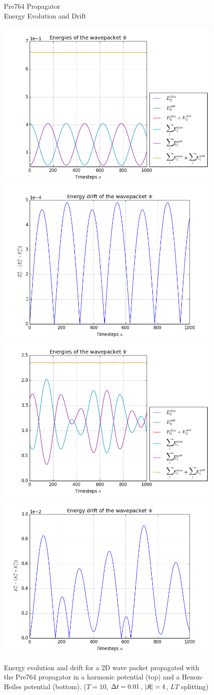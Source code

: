 \begin{figure}[ht]
	\centering
	\begin{minipage}[c]{\textwidth}
		\begin{center}
			\large Pre764 Propagator \\[1mm]
			\normalsize Energy Evolution and Drift
			\vspace{4mm}
		\end{center}
	\end{minipage}
	\includegraphics[width=.45\textwidth]{figures/harmonic_energies_Pre764.png}
	\includegraphics[width=.45\textwidth]{figures/harmonic_drift_Pre764.png} \\
	\includegraphics[width=.45\textwidth]{figures/henon_energies_Pre764.png}
	\includegraphics[width=.45\textwidth]{figures/henon_drift_Pre764.png}
	\caption{Energy evolution and drift for a 2D wave packet propagated with the Pre764 propagator in a harmonic potential (top) and a Henon-Heiles potential (bottom).
	($T = 10$, $\Delta t = 0.01$, $| \mathfrak{K} | = 4$, \emph{LT} splitting)}
	\label{fig:energy_Pre764}
\end{figure}
